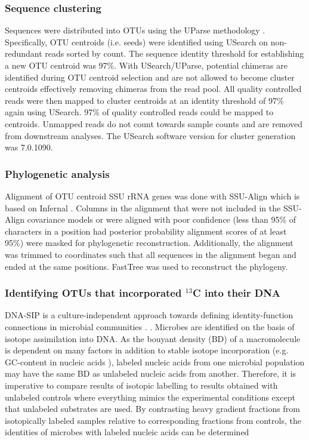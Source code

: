 \subsubsection{Sequence clustering}
Sequences were distributed into OTUs using the UParse methodology
\citep{Edgar_2013}. Specifically, OTU centroids (i.e. seeds) were identified
using USearch on non-redundant reads sorted by count. The sequence
identity threshold for establishing a new OTU centroid was 97\%. 
With USearch/UParse,
potential chimeras are identified during OTU centroid selection and are not
allowed to become cluster centroids effectively removing chimeras from the read
pool. All quality controlled reads were then mapped to cluster centroids at an
identity threshold of 97\% again using USearch. 97\% of quality
controlled reads could be mapped to centroids. Unmapped reads do not count
towards sample counts and are removed from downstream analyses. The
USearch software version for cluster generation was 7.0.1090.

\subsubsection{Phylogenetic analysis}
Alignment of OTU centroid SSU rRNA genes was done with SSU-Align which is based on Infernal
\citep{Nawrocki_2013,Nawrocki_2009}. Columns in the alignment that were not included in
the SSU-Align covariance models or were aligned with poor confidence (less than
95\% of characters in a position had posterior probability alignment scores of
at least 95\%) were masked for phylogenetic reconstruction. Additionally, the
alignment was trimmed to coordinates such that all sequences in the alignment
began and ended at the same positions. FastTree \cite{Price_2009} was used to
reconstruct the phylogeny.

\subsubsection{Identifying OTUs that incorporated $^{13}$C into their DNA}
DNA-SIP is a culture-independent approach towards defining identity-function
connections in microbial communities \cite{Buckley_2011,Neufeld_2007,Radajewski_2003}. . Microbes are identified on the basis of
isotope assimilation into DNA. As the bouyant density (BD) of a macromolecule is dependent on many factors in addition to stable isotope incorporation (e.g. GC-content in nucleic acids \cite{Youngblut_2014}),
labeled nucleic acids from one microbial population may have the same BD as unlabeled nucleic acids from another. Therefore, it is imperative to compare results of isotopic labelling to results obtained with unlabeled controls where everything mimics the experimental conditions except that unlabeled substrates are used. By contrasting heavy gradient fractions from isotopically labeled samples relative to corresponding fractions from controls, the identities of microbes with labeled nucleic acids can be
determined 

